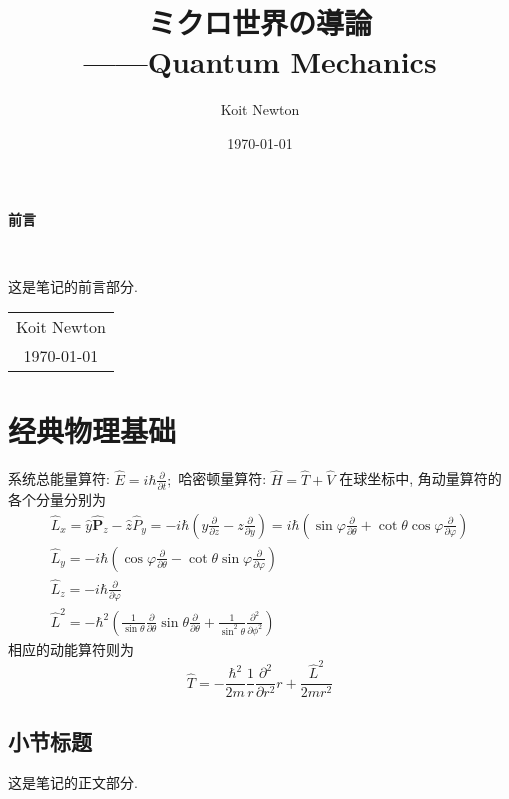\documentclass[12pt, a4paper, oneside]{ctexbook}
\title{{\Huge{\textbf{ミクロ世界の導論}}}\\——Quantum Mechanics}
\author{Koit Newton}
\date{\today}
\begin{document}
                                                            

\maketitle

\setcounter{page}{1}

\begin{center}
    \Huge\textbf{前言}
\end{center}~\

这是笔记的前言部分. 
~\\
\begin{flushright}
    \begin{tabular}{c}
        Koit Newton\\
        \today
    \end{tabular}
\end{flushright}

\newpage
{}
\setcounter{page}{1}
\tableofcontents
\newpage
\setcounter{page}{1}

\chapter{经典物理基础}
系统总能量算符: $\hat{E}=i \hbar \frac{\partial}{\partial t} ;$ 哈密顿量算符: $\hat{H}=\hat{T}+\hat{V}$ 在球坐标中, 角动量算符的各个分量分别为
$$
\begin{gathered}
\hat{L}_x=\hat{y} \hat{\boldsymbol{P}}_z-\hat{z} \hat{P}_y=-i \hbar\left(y \frac{\partial}{\partial z}-z \frac{\partial}{\partial y}\right)=i \hbar\left(\sin \varphi \frac{\partial}{\partial \theta}+\cot \theta \cos \varphi \frac{\partial}{\partial \varphi}\right) \\
\hat{L}_y=-i \hbar\left(\cos \varphi \frac{\partial}{\partial \theta}-\cot \theta \sin \varphi \frac{\partial}{\partial \varphi}\right) \\
\hat{L}_z=-i \hbar \frac{\partial}{\partial \varphi} \\
\hat{L}^2= - \hbar^2 \left( \frac{1}{\sin \theta} \frac{\partial}{\partial \theta} \sin \theta \frac{\partial}{\partial \theta} + \frac{1}{\sin^2 \theta} \frac{\partial^2}{\partial \phi^2} \right)
\end{gathered}
$$
相应的动能算符则为
$$
\hat{T}=-\frac{\hbar^2}{2 m} \frac{1}{r} \frac{\partial^2}{\partial r^2} r+\frac{\hat{L}^2}{2 m r^2}
$$


\section{小节标题}

这是笔记的正文部分. 
\end{document}
